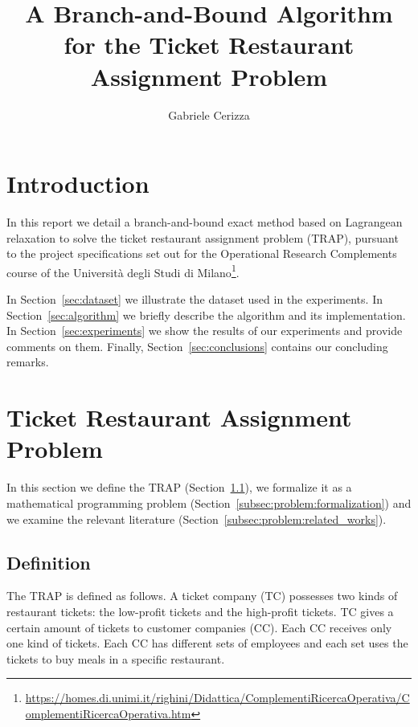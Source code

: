 \documentclass[runningheads]{llncs}
\begin{document}
\title{
  A Branch-and-Bound Algorithm for the Ticket Restaurant Assignment Problem
}
\author{Gabriele Cerizza}


\maketitle

\section*{Introduction}
\label{sec:introduction}

In this report we detail a branch-and-bound exact method based on Lagrangean relaxation to solve the ticket restaurant assignment problem (TRAP), pursuant to the project specifications set out for the Operational Research Complements course of the Università degli Studi di Milano\footnote{\url{https://homes.di.unimi.it/righini/Didattica/ComplementiRicercaOperativa/ComplementiRicercaOperativa.htm}}. 

In Section~\ref{sec:dataset} we illustrate the dataset used in the experiments. In Section~\ref{sec:algorithm} we briefly describe the algorithm and its implementation. In Section~\ref{sec:experiments} we show the results of our experiments and provide comments on them. Finally, Section~\ref{sec:conclusions} contains our concluding remarks. 

\section{Ticket Restaurant Assignment Problem}
\label{sec:problem}

In this section we define the TRAP (Section~\ref{subsec:problem:definition}), we formalize it as a mathematical programming problem (Section~\ref{subsec:problem:formalization}) and we examine the relevant literature (Section~\ref{subsec:problem:related_works}).

\subsection{Definition}
\label{subsec:problem:definition}

The TRAP is defined as follows. A ticket company (TC) possesses two kinds of restaurant tickets: the low-profit tickets and the high-profit tickets. TC gives a certain amount of tickets to customer companies (CC). Each CC receives only one kind of tickets. Each CC has different sets of employees and each set uses the tickets to buy meals in a specific restaurant.  
\end{document}

